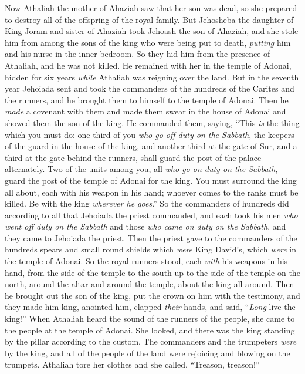 \begin{biblechapter} %
 Now Athaliah the mother of Ahaziah saw that her son was dead, so she prepared to destroy all of the offspring of the royal family.
\verse But Jehosheba the daughter of King Joram and sister of Ahaziah took Jehoash the son of Ahaziah, and she stole him from among the sons of the king who were being put to death, \textit{putting} him and his nurse in the inner bedroom. So they hid him from the presence of Athaliah, and he was not killed.
\verse He remained with her in the temple of Adonai, hidden for six years \textit{while} Athaliah was reigning over the land.
\verse But in the seventh year Jehoiada sent and took the commanders of the hundreds of the Carites and the runners, and he brought them to himself to the temple of Adonai. Then he \textit{made} a covenant with them and made them swear in the house of Adonai and showed them the son of the king.
\verse He commanded them, saying, “This \textit{is} the thing which you must do: one third of you \textit{who go off duty on the Sabbath}, the keepers of the guard in the house of the king,
\verse and another third at the gate of Sur, and a third at the gate behind the runners, shall guard the post of the palace alternately.
\verse Two of the units among you, all \textit{who go on duty on the Sabbath}, guard the post of the temple of Adonai for the king.
\verse You must surround the king all about, each with his weapon in his hand; whoever comes to the ranks must be killed. Be with the king \textit{wherever he goes}.”
\verse So the commanders of hundreds did according to all that Jehoiada the priest commanded, and each took his men \textit{who went off duty on the Sabbath} and those \textit{who came on duty on the Sabbath}, and they came to Jehoiada the priest.
\verse Then the priest gave to the commanders of the hundreds spears and small round shields which \textit{were} King David’s, which \textit{were} in the temple of Adonai.
\verse So the royal runners stood, each \textit{with} his weapons in his hand, from the side of the temple to the south up to the side of the temple on the north, around the altar and around the temple, about the king all around.
\verse Then he brought out the son of the king, put the crown on him with the testimony, and they made him king, anointed him, clapped \textit{their} hands, and said, “\textit{Long} live the king!”
\verse When Athaliah heard the sound of the runners of the people, she came to the people at the temple of Adonai.
\verse She looked, and there was the king standing by the pillar according to the custom. The commanders and the trumpeters \textit{were} by the king, and all of the people of the land were rejoicing and blowing on the trumpets. Athaliah tore her clothes and she called, “Treason, treason!”

\end{biblechapter}
